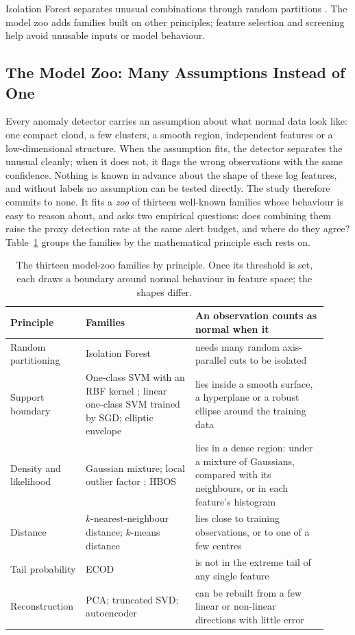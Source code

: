 \documentclass[11pt,a4paper]{article}
\begin{document}
Isolation Forest separates unusual combinations through random partitions \cite{ref3}. The model zoo adds families built on other principles; feature selection and screening help avoid unusable inputs or model behaviour.

\subsection{The Model Zoo: Many Assumptions Instead of One}\label{sec:core-zoo}

Every anomaly detector carries an assumption about what normal data look like: one compact cloud, a few clusters, a smooth region, independent features or a low-dimensional structure. When the assumption fits, the detector separates the unusual cleanly; when it does not, it flags the wrong observations with the same confidence. Nothing is known in advance about the shape of these log features, and without labels no assumption can be tested directly. The study therefore commits to none. It fits a \emph{zoo} of thirteen well-known families whose behaviour is easy to reason about, and asks two empirical questions: does combining them raise the proxy detection rate at the same alert budget, and where do they agree? Table~\ref{tab:core-zoo} groups the families by the mathematical principle each rests on.

\begin{table}[H]
\centering\small
\begin{tabular}{p{0.19\linewidth}p{0.33\linewidth}p{0.40\linewidth}}
\toprule
\textbf{Principle} & \textbf{Families} & \textbf{An observation counts as normal when it} \\
\midrule
Random partitioning & Isolation Forest \cite{ref3} & needs many random axis-parallel cuts to be isolated \\
Support boundary & One-class SVM with an RBF kernel \cite{ref23}; linear one-class SVM trained by SGD; elliptic envelope & lies inside a smooth surface, a hyperplane or a robust ellipse around the training data \\
Density and likelihood & Gaussian mixture; local outlier factor \cite{ref22}; HBOS \cite{ref24} & lies in a dense region: under a mixture of Gaussians, compared with its neighbours, or in each feature's histogram \\
Distance & \(k\)-nearest-neighbour distance; \(k\)-means distance & lies close to training observations, or to one of a few centres \\
Tail probability & ECOD \cite{ref25} & is not in the extreme tail of any single feature \\
Reconstruction & PCA; truncated SVD; autoencoder & can be rebuilt from a few linear or non-linear directions with little error \\
\bottomrule
\end{tabular}
\caption{The thirteen model-zoo families by principle. Once its threshold is set, each draws a boundary around normal behaviour in feature space; the shapes differ.}
\label{tab:core-zoo}
\end{table}
\end{document}
